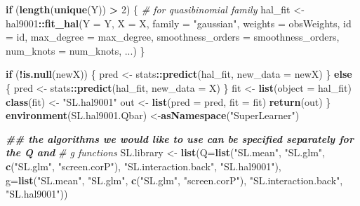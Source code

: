 \documentclass[
]{book}
\newenvironment{Shaded}{\begin{snugshade}}{\end{snugshade}}
\newcommand{\AttributeTok}[1]{\textcolor[rgb]{0.13,0.29,0.53}{#1}}
\newcommand{\CommentTok}[1]{\textcolor[rgb]{0.56,0.35,0.01}{\textit{#1}}}
\newcommand{\ControlFlowTok}[1]{\textcolor[rgb]{0.13,0.29,0.53}{\textbf{#1}}}
\newcommand{\DecValTok}[1]{\textcolor[rgb]{0.00,0.00,0.81}{#1}}
\newcommand{\DocumentationTok}[1]{\textcolor[rgb]{0.56,0.35,0.01}{\textbf{\textit{#1}}}}
\newcommand{\FunctionTok}[1]{\textcolor[rgb]{0.13,0.29,0.53}{\textbf{#1}}}
\newcommand{\NormalTok}[1]{#1}
\newcommand{\OtherTok}[1]{\textcolor[rgb]{0.56,0.35,0.01}{#1}}
\newcommand{\SpecialCharTok}[1]{\textcolor[rgb]{0.81,0.36,0.00}{\textbf{#1}}}
\newcommand{\StringTok}[1]{\textcolor[rgb]{0.31,0.60,0.02}{#1}}
\begin{document}
\begin{Shaded}
\begin{Highlighting}[]
  \ControlFlowTok{if}\NormalTok{ (}\FunctionTok{length}\NormalTok{(}\FunctionTok{unique}\NormalTok{(Y)) }\SpecialCharTok{\textgreater{}} \DecValTok{2}\NormalTok{) \{ }\CommentTok{\# for quasibinomial family}
\NormalTok{    hal\_fit }\OtherTok{\textless{}{-}}\NormalTok{ hal9001}\SpecialCharTok{::}\FunctionTok{fit\_hal}\NormalTok{(}\AttributeTok{Y =}\NormalTok{ Y, }\AttributeTok{X =}\NormalTok{ X, }\AttributeTok{family =} \StringTok{"gaussian"}\NormalTok{, }
                                \AttributeTok{weights =}\NormalTok{ obsWeights, }\AttributeTok{id =}\NormalTok{ id, }\AttributeTok{max\_degree =}\NormalTok{ max\_degree, }
                                \AttributeTok{smoothness\_orders =}\NormalTok{ smoothness\_orders, }\AttributeTok{num\_knots =}\NormalTok{ num\_knots, }
\NormalTok{                                ...)}
\NormalTok{  \}}
  
  \ControlFlowTok{if}\NormalTok{ (}\SpecialCharTok{!}\FunctionTok{is.null}\NormalTok{(newX)) \{}
\NormalTok{    pred }\OtherTok{\textless{}{-}}\NormalTok{ stats}\SpecialCharTok{::}\FunctionTok{predict}\NormalTok{(hal\_fit, }\AttributeTok{new\_data =}\NormalTok{ newX)}
\NormalTok{  \}}
  \ControlFlowTok{else}\NormalTok{ \{}
\NormalTok{    pred }\OtherTok{\textless{}{-}}\NormalTok{ stats}\SpecialCharTok{::}\FunctionTok{predict}\NormalTok{(hal\_fit, }\AttributeTok{new\_data =}\NormalTok{ X)}
\NormalTok{  \}}
\NormalTok{  fit }\OtherTok{\textless{}{-}} \FunctionTok{list}\NormalTok{(}\AttributeTok{object =}\NormalTok{ hal\_fit)}
  \FunctionTok{class}\NormalTok{(fit) }\OtherTok{\textless{}{-}} \StringTok{"SL.hal9001"}
\NormalTok{  out }\OtherTok{\textless{}{-}} \FunctionTok{list}\NormalTok{(}\AttributeTok{pred =}\NormalTok{ pred, }\AttributeTok{fit =}\NormalTok{ fit)}
  \FunctionTok{return}\NormalTok{(out)}
\NormalTok{\}}
\FunctionTok{environment}\NormalTok{(SL.hal9001.Qbar) }\OtherTok{\textless{}{-}}\FunctionTok{asNamespace}\NormalTok{(}\StringTok{"SuperLearner"}\NormalTok{)}

\DocumentationTok{\#\# the algorithms we would like to use can be specified separately for the Q and }
\CommentTok{\# g functions}
\NormalTok{SL.library }\OtherTok{\textless{}{-}} \FunctionTok{list}\NormalTok{(}\AttributeTok{Q=}\FunctionTok{list}\NormalTok{(}\StringTok{"SL.mean"}\NormalTok{, }\StringTok{"SL.glm"}\NormalTok{, }\FunctionTok{c}\NormalTok{(}\StringTok{"SL.glm"}\NormalTok{, }\StringTok{"screen.corP"}\NormalTok{), }
                       \StringTok{"SL.interaction.back"}\NormalTok{, }\StringTok{"SL.hal9001"}\NormalTok{),}
                   \AttributeTok{g=}\FunctionTok{list}\NormalTok{(}\StringTok{"SL.mean"}\NormalTok{, }\StringTok{"SL.glm"}\NormalTok{, }\FunctionTok{c}\NormalTok{(}\StringTok{"SL.glm"}\NormalTok{, }\StringTok{"screen.corP"}\NormalTok{), }
                       \StringTok{"SL.interaction.back"}\NormalTok{, }\StringTok{"SL.hal9001"}\NormalTok{))}


\end{Highlighting}
\end{Shaded}
\end{document}

